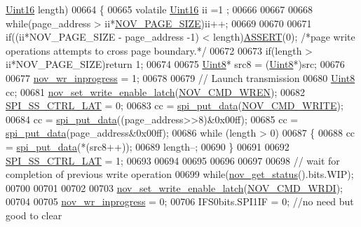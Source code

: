 \begin{DoxyCode}
      \hyperlink{a00072_a59a9f6be4562c327cbfb4f7e8e18f08b}{Uint16} length)
00664 \{
00665     \textcolor{keyword}{volatile} \hyperlink{a00072_a59a9f6be4562c327cbfb4f7e8e18f08b}{Uint16} ii =1 ;
00666     
00667 
00668     \textcolor{keywordflow}{while}(page\_address > ii*\hyperlink{a00029_aad44ced0f63ecf5d2ced5bc0bf220287}{NOV\_PAGE\_SIZE})ii++;
00669 
00670     
00671     \textcolor{keywordflow}{if}((ii*NOV\_PAGE\_SIZE - page\_address -1) < length)\hyperlink{a00072_abb8ff8e213ac9f6fb21d2b968583b936}{ASSERT}(0);  \textcolor{comment}{/*page write operations attempts to
       cross page boundary.*/}
00672           
00673     \textcolor{keywordflow}{if}(length > ii*NOV\_PAGE\_SIZE)\textcolor{keywordflow}{return} 1;
00674 
00675     \hyperlink{a00072_af84840501dec18061d18a68c162a8fa2}{Uint8}* src8 = (\hyperlink{a00072_af84840501dec18061d18a68c162a8fa2}{Uint8}*)src;
00676 
00677     \hyperlink{a00060_a56fe014653ebdce270aeac664bf86e65}{nov\_wr\_inprogress} = 1;
00678 
00679     \textcolor{comment}{// Launch transmission}
00680     \hyperlink{a00072_af84840501dec18061d18a68c162a8fa2}{Uint8} cc;
00681     \hyperlink{a00060_a7b698f4b0088c4e28951c2204b7b821e}{nov\_set\_write\_enable\_latch}(\hyperlink{a00029_acc9f91a7c7d40a32755560dda080cf98}{NOV\_CMD\_WREN});
00682     \hyperlink{a00013_aa8b53e04161d178ebd9c01edf1584039}{SPI\_SS\_CTRL\_LAT} = 0;
00683     cc = \hyperlink{a00013_a19e2dff580e4d1b2198fa9108fca81ac}{spi\_put\_data}(\hyperlink{a00029_a031aab76ddb1258273541a65d70acbe1}{NOV\_CMD\_WRITE});
00684     cc = \hyperlink{a00013_a19e2dff580e4d1b2198fa9108fca81ac}{spi\_put\_data}((page\_address>>8)&0x00ff);
00685     cc = \hyperlink{a00013_a19e2dff580e4d1b2198fa9108fca81ac}{spi\_put\_data}(page\_address&0x00ff);
00686     \textcolor{keywordflow}{while} (length > 0)
00687     \{
00688            cc = \hyperlink{a00013_a19e2dff580e4d1b2198fa9108fca81ac}{spi\_put\_data}(*(src8++));  
00689            length--;
00690     \}
00691    
00692     \hyperlink{a00013_aa8b53e04161d178ebd9c01edf1584039}{SPI\_SS\_CTRL\_LAT} = 1;
00693 
00694 
00695 
00696 
00697 
00698     \textcolor{comment}{// wait for completion of previous write operation}
00699     \textcolor{keywordflow}{while}(\hyperlink{a00060_af9ccbc198ed63feb4fd6c18dd934590d}{nov\_get\_status}().bits.WIP);
00700     
00701 
00702 
00703     \hyperlink{a00060_a7b698f4b0088c4e28951c2204b7b821e}{nov\_set\_write\_enable\_latch}(\hyperlink{a00029_a3924df5fbf1e1ff642a9bde06e17b69d}{NOV\_CMD\_WRDI});
00704 
00705     \hyperlink{a00060_a56fe014653ebdce270aeac664bf86e65}{nov\_wr\_inprogress} = 0;
00706     IFS0bits.SPI1IF = 0;   \textcolor{comment}{//no need but good to clear}

\end{DoxyCode}
